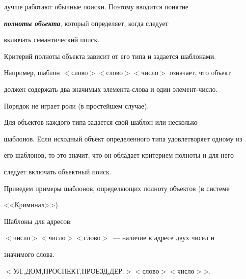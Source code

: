 лучше работают обычные поиски. Поэтому вводится понятие 


{\bfseries\textit{полноты объекта}}, который определяет, когда следует 


включать семантический поиск. 


    


    Критерий полноты объекта зависит от его типа и задается шаблонами. 


Например, шаблон $<$слово$>$$<$слово$>$$<$чис\-ло$>$ означает, что объект 


должен содержать два значимых эле\-мен\-та-сло\-ва и один эле\-мент-чис\-ло. 


Порядок не играет роли (в простейшем случае).


    


    Для объектов каждого типа задается свой шаблон или несколько 


шаб\-ло\-нов. Если исходный объект определенного типа удовлетворяет одному из 


его шаб\-ло\-нов, то это значит, что он обладает критерием полноты и для него 


следует включать объектный поиск.


    


    Приведем примеры шаблонов, определяющих полноту объектов (в системе 


<<Криминал>>).





\pagebreak


    


    Шаблоны для адресов:


    


         \smallskip


    


{\small





\noindent


    $<$число$>$$<$число$>$$<$слово$>$~--- наличие в адресе двух чисел и 


значимого слова.


    


\noindent


    $<$УЛ.,ДОМ,ПРОСПЕКТ,ПРОЕЗД,ДЕР.$>$$<$слово$>$$<$число$>$>.


    }


